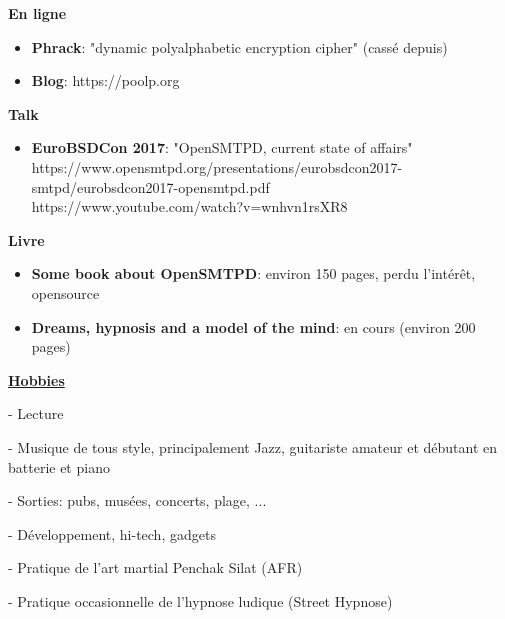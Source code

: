 \documentclass[a4paper,10pt]{letter}
\begin{document}
\textbf{En ligne}
\begin{itemize}
\item	\textbf{Phrack}: "dynamic polyalphabetic encryption cipher" (cass\'e depuis)
\item	\textbf{Blog}: https://poolp.org\\
\end{itemize}

\textbf{Talk}
\begin{itemize}
\item	\textbf{EuroBSDCon 2017}: "OpenSMTPD, current state of affairs"\\
  https://www.opensmtpd.org/presentations/eurobsdcon2017-smtpd/eurobsdcon2017-opensmtpd.pdf\\
  https://www.youtube.com/watch?v=wnhvn1rsXR8\\
\end{itemize}


\textbf{Livre}
\begin{itemize}
\item	\textbf{Some book about OpenSMTPD}: environ 150 pages, perdu l'int\'er\^et, opensource
\item	\textbf{Dreams, hypnosis and a model of the mind}: en cours (environ 200 pages)\\
\end{itemize}


\underline{\textbf{Hobbies}}\\
\begin{description}
\item - Lecture
\item - Musique de tous style, principalement Jazz, guitariste amateur et d\'ebutant en batterie et piano
\item - Sorties: pubs, mus\'ees, concerts, plage, ...
\item - D\'eveloppement, hi-tech, gadgets
\item - Pratique de l'art martial Penchak Silat (AFR)
\item - Pratique occasionnelle de l'hypnose ludique (Street Hypnose)\\
\end{description}
\end{document}
